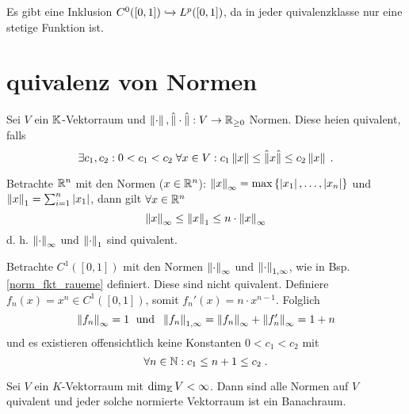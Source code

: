 	\begin{rem}
		Es gibt eine Inklusion \(C^0([0,1])\xhookrightarrow{} L^p([0,1])\), da in jeder \As quivalenzklasse nur eine stetige Funktion ist.
	\end{rem}
	
	\section{\As quivalenz von Normen}
	\begin{definition}
		Sei $V$ ein $\mathbb{K}$-Vektorraum und \(\left\lVert\cdot\right\rVert, \hat\lVert\cdot\hat\rVert: V \to \mathbb{R}_{\geq 0}\) Normen. Diese hei\s en \as quivalent, falls
		\[\exists c_1, c_2: 0 < c_1 < c_2 \; \forall x \in V : c_1 \left\lVert x\right\rVert \leq \hat\lVert x\hat\rVert \leq c_2 \left\lVert x\right\rVert\;.\]
	\end{definition}
	
	\begin{ex}
		Betrachte \(\mathbb{R}^n\) mit den Normen (\(x\in\mathbb{R}^n\)): \(\left\lVert x\right\rVert_\infty = \max\left\{\left\lvert x_1 \right\rvert,\ldots, \left\lvert x_n \right\rvert\right\}\) und \(\left\lVert x\right\rVert_{1} = \sum_{i=1}^n \left\lvert x_1 \right\rvert\), dann gilt \(\forall x\in \mathbb{R}^n\)
		\[\left\lVert x\right\rVert_\infty \leq \left\lVert x\right\rVert_{1} \leq n\cdot \left\lVert x\right\rVert_\infty\]
		d. h. \(\left\lVert\cdot\right\rVert_\infty\) und \(\left\lVert\cdot\right\rVert_{1}\) sind \as quivalent.
	\end{ex}
	
	\begin{ex}
		Betrachte \(C^1([0,1])\) mit den Normen \(\left\lVert\cdot\right\rVert_\infty \) und \(\left\lVert\cdot\right\rVert_{1,\infty}\), wie in Bsp. \ref{norm_fkt_raueme} definiert. Diese sind nicht \as quivalent. Definiere \(f_n(x) = x^n \in C^1([0,1])\), somit \(f_n'(x) = n \cdot x^{n-1}\). Folglich
		\[\left\lVert f_n\right\rVert_\infty = 1 \;\text { und }\; \left\lVert f_n\right\rVert_{1, \infty} = \left\lVert f_n\right\rVert_\infty + \left\lVert f_n'\right\rVert_\infty = 1 + n\] 
		und es existieren offensichtlich keine Konstanten \(0<c_1<c_2\) mit 
		\[\forall n \in \mathbb{N}: c_1 \leq n+1 \leq c_2\;.\]
	\end{ex}
	
	\begin{theorem}
		Sei $V$ ein $K$-Vektorraum mit \(\dim_{\mathbb{K}} V < \infty\). Dann sind alle Normen auf $V$ \as quivalent und jeder solche normierte Vektorraum ist ein Banachraum.
	\end{theorem}